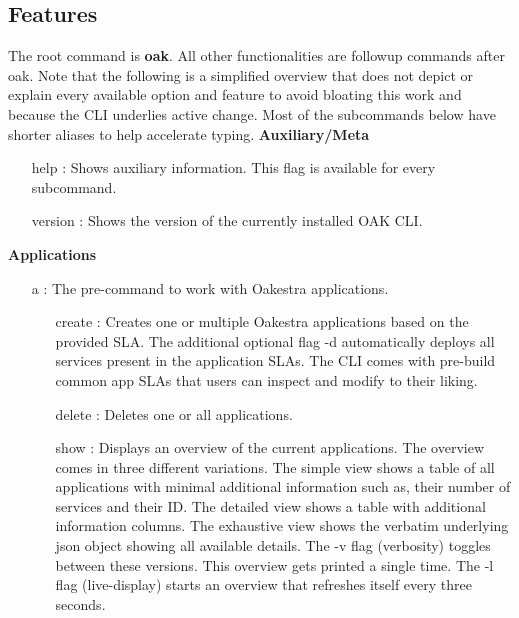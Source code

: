 \subsection{Features}

The root command is \textbf{oak}.
All other functionalities are followup commands after oak.
Note that the following is a simplified overview that does not depict or explain every available option and feature to avoid bloating this work and because the CLI underlies active change.
Most of the subcommands below have shorter aliases to help accelerate typing.
\vspace{5mm}
\newline
\textbf{Auxiliary/Meta}
\begin{itemize}
    \item [help]:
        Shows auxiliary information.
        This flag is available for every subcommand.
    \item [version]:
        Shows the version of the currently installed OAK CLI.
\end{itemize}
\vspace{5mm}
\textbf{Applications}
\begin{itemize}
    \item [a]:
        The pre-command to work with Oakestra applications.
        \begin{itemize}
            \item [create]:
                Creates one or multiple Oakestra applications based on the provided SLA.
                The additional optional flag -d automatically deploys all services present in the application SLAs.
                The CLI comes with pre-build common app SLAs that users can inspect and modify to their liking.
            \item [delete]:
                Deletes one or all applications.
            \item [show]:
                Displays an overview of the current applications.
                The overview comes in three different variations.
                The simple view shows a table of all applications with minimal additional information such as, their number of services and their ID.
                The detailed view shows a table with additional information columns.
                The exhaustive view shows the verbatim underlying json object showing all available details.
                The -v flag (verbosity) toggles between these versions.
                This overview gets printed a single time.
                The -l flag (live-display) starts an overview that refreshes itself every three seconds.
        \end{itemize}
\end{itemize}

